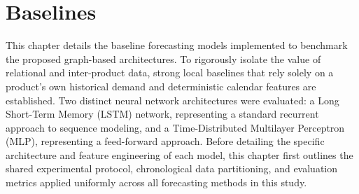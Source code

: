 \chapter{Baselines}

This chapter details the baseline forecasting models implemented to benchmark the proposed graph-based architectures. To rigorously isolate the value of relational and inter-product data, strong local baselines that rely solely on a product's own historical demand and deterministic calendar features are established. Two distinct neural network architectures were evaluated: a Long Short-Term Memory (LSTM) network, representing a standard recurrent approach to sequence modeling, and a Time-Distributed Multilayer Perceptron (MLP), representing a feed-forward approach. Before detailing the specific architecture and feature engineering of each model, this chapter first outlines the shared experimental protocol, chronological data partitioning, and evaluation metrics applied uniformly across all forecasting methods in this study.

